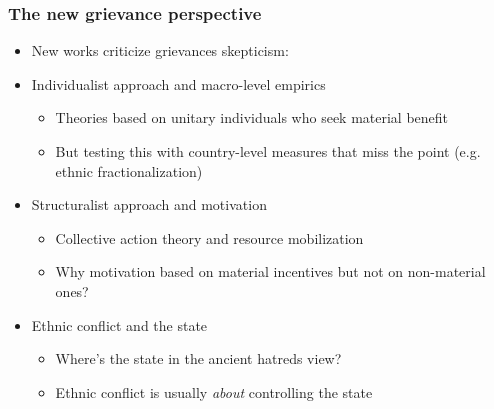 \documentclass[aspectratio=43]{beamer}
\begin{document}
\begin{frame}
\frametitle{The new grievance perspective}
\centering

\begin{itemize}
  \item<1-> New works criticize grievances skepticism:
  \item<2-> Individualist approach and macro-level empirics
  \begin{itemize}
    \item Theories based on unitary individuals who seek material benefit
    \item But testing this with country-level measures that miss the point (e.g. ethnic fractionalization)
  \end{itemize}
  \item<3-> Structuralist approach and motivation
  \begin{itemize}
    \item Collective action theory and resource mobilization
    \item Why motivation based on material incentives but not on non-material ones?
  \end{itemize}
  \item<4-> Ethnic conflict and the state
  \begin{itemize}
    \item Where's the state in the ancient hatreds view?
    \item Ethnic conflict is usually \textit{about} controlling the state
  \end{itemize}
\end{itemize}

\end{frame}
\end{document}
